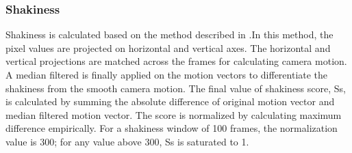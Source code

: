 \documentclass{sig-alternate}
\begin{document}
\subsubsection{Shakiness}
Shakiness is calculated based on the method described in \cite{web:4}.In this method, the pixel values are projected on horizontal and vertical axes. The horizontal and vertical projections are matched across the frames for calculating camera motion. A median filtered is finally applied on the motion vectors to differentiate the shakiness from the smooth camera motion. The final value of shakiness score, Ss, is calculated by summing the absolute difference of original motion vector and median filtered motion vector. The score is normalized by calculating maximum difference empirically. For a shakiness window of 100 frames, the normalization value is 300;
for any value above 300, Ss is saturated to 1.
\end{document}
